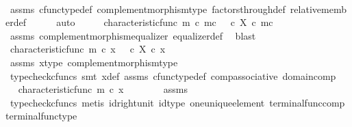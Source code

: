 \begin{isabellebody}
\ \ \ \ \isamarkupfalse%
\ assms\ cfunc{\isacharunderscore}{\kern0pt}type{\isacharunderscore}{\kern0pt}def\ complement{\isacharunderscore}{\kern0pt}morphism{\isacharunderscore}{\kern0pt}type\ factors{\isacharunderscore}{\kern0pt}through{\isacharunderscore}{\kern0pt}def\ relative{\isacharunderscore}{\kern0pt}member{\isacharunderscore}{\kern0pt}def{}\isanewline
\ \ \ \ \isamarkupfalse%
\ auto\isanewline
\ \ \isamarkupfalse%
\ \isamarkupfalse%
\ {\isachardoublequoteopen}characteristic{\isacharunderscore}{\kern0pt}func\ m\ {\isasymcirc}\isactrlsub c\ m\isactrlsup c\ {\isacharequal}{\kern0pt}\ {\isacharparenleft}{\kern0pt}{\isasymf}\ {\isasymcirc}\isactrlsub c\ {\isasymbeta}\isactrlbsub X\isactrlesub {\isacharparenright}{\kern0pt}\ {\isasymcirc}\isactrlsub c\ m\isactrlsup c{\isachardoublequoteclose}\isanewline
\ \ \ \ \isamarkupfalse%
\ assms\ complement{\isacharunderscore}{\kern0pt}morphism{\isacharunderscore}{\kern0pt}equalizer\ equalizer{\isacharunderscore}{\kern0pt}def\ \isamarkupfalse%
\ blast\isanewline
\ \ \isamarkupfalse%
\ \isamarkupfalse%
\ {\isachardoublequoteopen}characteristic{\isacharunderscore}{\kern0pt}func\ m\ {\isasymcirc}\isactrlsub c\ x\ {\isacharequal}{\kern0pt}\ {\isasymf}\ {\isasymcirc}\isactrlsub c\ {\isasymbeta}\isactrlbsub X\isactrlesub \ {\isasymcirc}\isactrlsub c\ x{\isachardoublequoteclose}\isanewline
\ \ \ \ \isamarkupfalse%
\ assms\ x{\isacharprime}{\kern0pt}{\isacharunderscore}{\kern0pt}type\ complement{\isacharunderscore}{\kern0pt}morphism{\isacharunderscore}{\kern0pt}type\isanewline
\ \ \ \ \isamarkupfalse%
\ {\isacharparenleft}{\kern0pt}typecheck{\isacharunderscore}{\kern0pt}cfuncs{\isacharcomma}{\kern0pt}\ smt\ x{\isacharprime}{\kern0pt}{\isacharunderscore}{\kern0pt}def\ assms\ cfunc{\isacharunderscore}{\kern0pt}type{\isacharunderscore}{\kern0pt}def\ comp{\isacharunderscore}{\kern0pt}associative\ domain{\isacharunderscore}{\kern0pt}comp{\isacharparenright}{\kern0pt}\isanewline
\ \ \isamarkupfalse%
\ \isamarkupfalse%
\ {\isachardoublequoteopen}characteristic{\isacharunderscore}{\kern0pt}func\ m\ {\isasymcirc}\isactrlsub c\ x\ {\isacharequal}{\kern0pt}\ {\isasymf}{\isachardoublequoteclose}\isanewline
\ \ \ \ \isamarkupfalse%
\ assms\ \isamarkupfalse%
\ {\isacharparenleft}{\kern0pt}typecheck{\isacharunderscore}{\kern0pt}cfuncs{\isacharcomma}{\kern0pt}\ metis\ id{\isacharunderscore}{\kern0pt}right{\isacharunderscore}{\kern0pt}unit{}\ id{\isacharunderscore}{\kern0pt}type\ one{\isacharunderscore}{\kern0pt}unique{\isacharunderscore}{\kern0pt}element\ terminal{\isacharunderscore}{\kern0pt}func{\isacharunderscore}{\kern0pt}comp\ terminal{\isacharunderscore}{\kern0pt}func{\isacharunderscore}{\kern0pt}type{\isacharparenright}{\kern0pt}\isanewline

\end{isabellebody}
